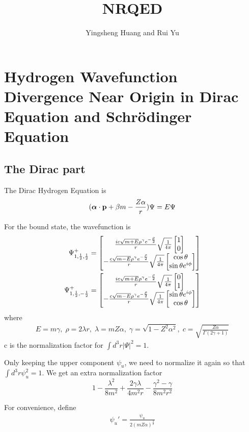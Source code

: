 \documentclass{article}
\title{NRQED}
\author{Yingsheng Huang and Rui Yu}
\newcommand{\vbp}{\vb{p}}
\renewcommand{\a}{\alpha}
\renewcommand{\b}{\beta}
\begin{document}
\maketitle
\section{Hydrogen Wavefunction Divergence Near Origin in Dirac Equation and Schr\"odinger Equation}
\subsection{The Dirac part}
The Dirac Hydrogen Equation is
\begin{align}
	(\bm{\a}\cdot \vbp+\b m-\frac{Z\a}{r} )\Psi=E\Psi
\end{align}

For the bound state, the wavefunction is
\begin{align}
	\Psi^+_{1,\frac{1}{2},\frac{1}{2}}  & =\bmqty{\frac{ic\sqrt{m+E}\rho^{\gamma}e^{-\frac{\rho}{2}}}{r}\sqrt{\frac{1}{4\pi}}\bmqty{1 \\0}\\-\frac{c\sqrt{m-E}\rho^{\gamma}e^{-\frac{\rho}{2}}}{r}\sqrt{\frac{1}{4\pi}}\bmqty{\cos\theta\\\sin\theta e^{i\phi}}}\\
	\Psi^+_{1,\frac{1}{2},-\frac{1}{2}} & =\bmqty{\frac{ic\sqrt{m+E}\rho^{\gamma}e^{-\frac{\rho}{2}}}{r}\sqrt{\frac{1}{4\pi}}\bmqty{0 \\1}\\-\frac{c\sqrt{m-E}\rho^{\gamma}e^{-\frac{\rho}{2}}}{r}\sqrt{\frac{1}{4\pi}}\bmqty{\sin\theta e^{i\phi}\\\cos\theta}}
\end{align}
where
\begin{align}
	E=m\gamma,\;\rho=2\lambda r,\;\lambda=mZ\a,\;
	\gamma=\sqrt{1-Z^2\a^2},\;c=\sqrt{\frac{Z\a}{\Gamma(2\gamma+1)}}
\end{align}
c is the normalization factor for $\int d^3r|\Psi|^2=1$. 

Only keeping the upper component $\psi_u$, we need to normalize it again so that $\int d^3r\psi_u^2=1$. We get an extra normalization factor
$$1-\frac{\lambda^2}{8m^2}+\frac{2\gamma\lambda}{4m^2r}-\frac{\gamma^2-\gamma}{8m^2r^2}$$

For convenience, define
\begin{align}
	\psi_u '=\frac{\psi_u}{2(mZ\alpha)^\frac{3}{2}}
\end{align}
\end{document}
